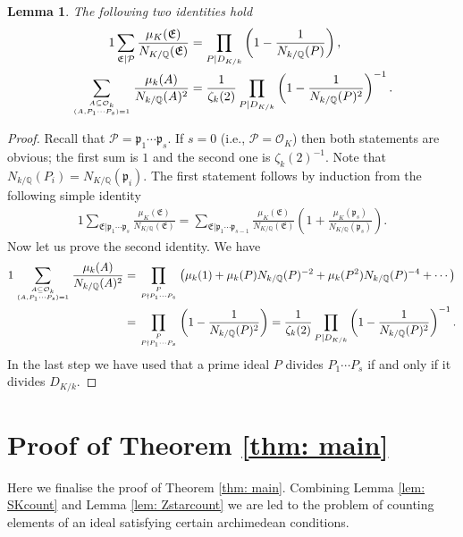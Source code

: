 \documentclass[11pt]{amsart}
\newtheorem{lemma}{Lemma}[section]
\numberwithin{equation}{eqncounter}
\def\IQ{\mathbb Q}
\def\Pc{\mathcal{P}}
\def\p{\mathfrak{p}}
\def\E{\mathfrak{E}}
\def\Oseen{{\mathcal{O}}}
\def\dis{D_{K/k}}
\begin{document}
\begin{lemma}\label{lem: constantspositive}
The following two identities hold
\begin{alignat*}1
\sum_{\E|\Pc}\frac{\mu_K(\E)}{N_{K/\IQ}(\E)}&=\prod_{P|\dis}\left(1-\frac{1}{N_{k/\IQ}(P)}\right),\\
\sum_{A\subseteq \Oseen_k \atop (A,P_1\cdots P_s)=1}\frac{\mu_k(A)}{N_{k/\IQ}(A)^2}&=\frac{1}{\zeta_k(2)}\prod_{P|\dis}\left(1-\frac{1}{N_{k/\IQ}(P)^2}\right)^{-1}.
\end{alignat*}
\end{lemma}
\begin{proof}
Recall that $\Pc=\p_1\cdots\p_s$.
If $s=0$  (i.e., $\Pc=\Oseen_K$) then both statements are obvious;  the first sum is $1$ and the second one is $\zeta_k(2)^{-1}$.
Note that $N_{k/\IQ}(P_i)=N_{K/\IQ}(\p_i)$. The first statement follows by induction from the following simple identity
\begin{alignat*}1
\sum_{\E|\p_1\cdots\p_{s}}\frac{\mu_K(\E)}{N_{K/\IQ}(\E)}=\sum_{\E|\p_1\cdots\p_{s-1}}\frac{\mu_K(\E)}{N_{K/\IQ}(\E)}\left(1+\frac{\mu_K(\p_s)}{N_{K/\IQ}(\p_s)}\right).
\end{alignat*}
Now let us prove the  second identity. We have
\begin{alignat*}1
\sum_{A\subseteq \Oseen_k \atop (A,P_1\cdots P_s)=1}\frac{\mu_k(A)}{N_{k/\IQ}(A)^2}&=\prod_{P\atop P\nmid P_1\cdots P_s}\left(\mu_k(1)+\mu_k(P)N_{k/\IQ}(P)^{-2}+\mu_k(P^2)N_{k/\IQ}(P)^{-4}+\cdots \right)\\
&=\prod_{P\atop P\nmid P_1\cdots P_s}\left(1-\frac{1}{N_{k/\IQ}(P)^2}\right)=\frac{1}{\zeta_k(2)}\prod_{P|\dis}\left(1-\frac{1}{N_{k/\IQ}(P)^2}\right)^{-1}.
\end{alignat*}
In the last step we have used that a prime ideal $P$ divides $P_1\cdots P_s$ if and only if it divides $\dis$.
\end{proof}






\section{Proof of Theorem \ref{thm: main}}\label{sec: proofmainthm}
Here we finalise the proof of Theorem \ref{thm: main}. 
Combining Lemma \ref{lem: SKcount} and Lemma \ref{lem: Zstarcount} we are led to the problem of counting elements of an ideal satisfying  certain archimedean conditions.  
\end{document}
